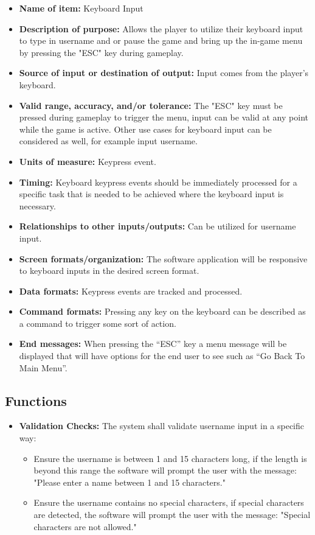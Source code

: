\documentclass{article}
\begin{document}
\begin{itemize}
    \item \textbf{Name of item:} Keyboard Input
    \item \textbf{Description of purpose:} Allows the player to utilize their keyboard input to type in username and or pause the game and bring up the in-game menu by pressing the "ESC" key during gameplay.
    \item \textbf{Source of input or destination of output:} Input comes from the player’s keyboard.
    \item \textbf{Valid range, accuracy, and/or tolerance:} The "ESC" key must be pressed during gameplay to trigger the menu, input can be valid at any point while the game is active. Other use cases for keyboard input can be considered as well, for example input username.
    \item \textbf{Units of measure:} Keypress event.
    \item \textbf{Timing:} Keyboard keypress events should be immediately processed for a specific task that is needed to be achieved where the keyboard input is necessary.
    \item \textbf{Relationships to other inputs/outputs:} Can be utilized for username input.
    \item \textbf{Screen formats/organization:} The software application will be responsive to keyboard inputs in the desired screen format.
    \item \textbf{Data formats:} Keypress events are tracked and processed.
    \item \textbf{Command formats:} Pressing any key on the keyboard can be described as a command to trigger some sort of action.
    \item \textbf{End messages:} When pressing the “ESC” key a menu message will be displayed that will have options for the end user to see such as “Go Back To Main Menu”.
\end{itemize}

\subsection{Functions}

\begin{itemize}
    \item \textbf{Validation Checks:}
        The system shall validate username input in a specific way: 
        \begin{itemize}
            \item Ensure the username is between 1 and 15 characters long, if the length is beyond this range the software will prompt the user with the message: "Please enter a name between 1 and 15 characters."
            \item Ensure the username contains no special characters, if special characters are detected, the software will prompt the user with the message: "Special characters are not allowed."
        \end{itemize}
\end{itemize}
\end{document}
